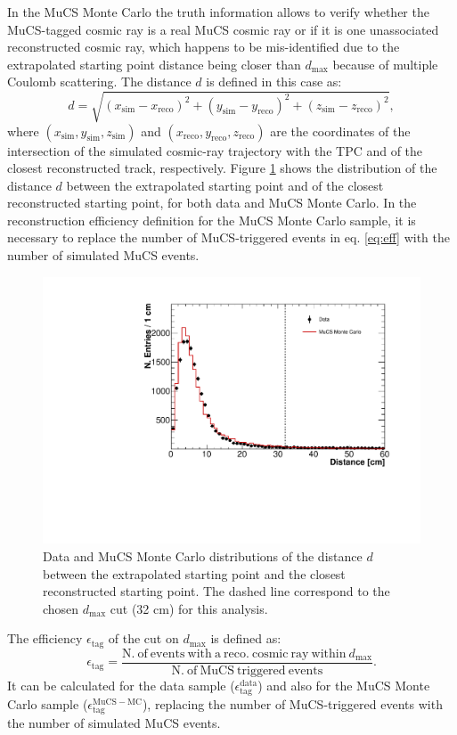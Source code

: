 \documentclass[a4paper,11pt]{article}
\begin{document}
In the MuCS Monte Carlo the truth information allows to verify whether the MuCS-tagged cosmic ray is a real MuCS cosmic ray or if it is one unassociated reconstructed cosmic ray, which happens to be mis-identified due to the extrapolated starting point distance being closer than $d_{\mathrm{max}}$ because of multiple Coulomb scattering.
The distance $d$ is defined in this case as:
\begin{equation}\label{eq:d_mc}
d = \sqrt{(x_{\mathrm{sim}}-x_{\mathrm{reco}})^2+(y_{\mathrm{sim}}-y_{\mathrm{reco}})^2+(z_{\mathrm{sim}}-z_{\mathrm{reco}})^2},
\end{equation}
where $(x_{\mathrm{sim}},y_{\mathrm{sim}},z_{\mathrm{sim}})$ and $(x_{\mathrm{reco}},y_{\mathrm{reco}},z_{\mathrm{reco}})$ are the coordinates of the intersection of the simulated cosmic-ray trajectory with the TPC and of the closest reconstructed track, respectively. Figure \ref{fig:dist} shows the distribution of the distance $d$ between the extrapolated starting point and of the closest reconstructed starting point, for both data and MuCS Monte Carlo.
In the reconstruction efficiency definition for the MuCS Monte Carlo sample, it is necessary to replace the number of MuCS-triggered events in eq. \eqref{eq:eff} with the number of simulated MuCS events.

\begin{figure}[htbp]
  \begin{center}
    \includegraphics[width=0.7\linewidth]{figures/dist.pdf}
    \caption{Data and MuCS Monte Carlo distributions of the distance $d$ between the extrapolated starting point and the closest reconstructed starting point. The dashed line correspond to the chosen $d_{\mathrm{max}}$ cut (32 cm) for this analysis.} \label{fig:dist}
  \end{center}
\end{figure}

The efficiency $\epsilon_{\mathrm{tag}}$ of the cut on $d_{\mathrm{max}}$ is defined as:
\begin{equation}
  \epsilon_{\mathrm{tag}}=\frac{\mathrm{N.~of~events~with~a~reco.~cosmic~ray~within~}d_{\mathrm{max}}}{\mathrm{N.~of~MuCS~triggered~events}}.
\end{equation}
It can be calculated for the data sample ($\epsilon^{\mathrm{data}}_{\mathrm{tag}}$) and also for the MuCS Monte Carlo sample ($\epsilon^{\mathrm{MuCS-MC}}_{\mathrm{tag}}$), replacing the number of MuCS-triggered events with the number of simulated MuCS events.
\end{document}
